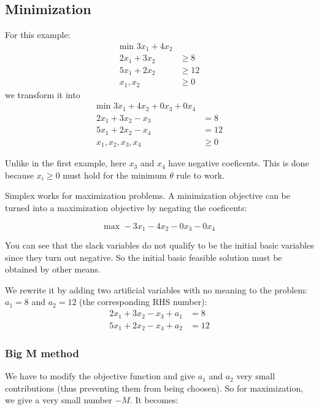 \documentclass[a4paper, 12pt]{article}
\begin{document}
\subsection{Minimization}

For this example:
\begin{align*}
    \text{min } 3x_1 + 4x_2 \\
    2x_1 + 3x_2 &\ge 8 \\
    5x_1 + 2x_2 &\ge 12 \\
    x_1,x_2 &\ge 0
\end{align*}
we transform it into
\begin{align*}
    \text{min } 3x_1 + 4x_2 + 0x_3 + 0x_4 \\
    2x_1 + 3x_2 - x_3 &= 8 \\
    5x_1 + 2x_2 - x_4 &= 12 \\
    x_1,x_2,x_3,x_4 &\ge 0
\end{align*}

Unlike in the first example, here $x_3$ and $x_4$ have negative coeficents. This
is done because $x_i \ge 0$ must hold for the minimum $\theta$ rule to work.

Simplex works for maximization problems. A minimization objective can be turned
into a maximization objective by negating the coeficents:

\begin{equation*}
    \text{max } -3x_1 - 4x_2 - 0x_3 - 0x_4
\end{equation*}

You can see that the slack variables do not qualify to be the initial basic
variables since they turn out negative. So the initial basic feasible solution
must be obtained by other means.

We rewrite it by adding two artificial variables with no meaning to the
problem: $a_1 = 8$ and $a_2 = 12$ (the corresponding RHS number):
\begin{align*}
    2x_1 + 3x_2 - x_3 + a_1 &= 8 \\
    5x_1 + 2x_2 - x_4 + a_2 &= 12
\end{align*}

\subsubsection{Big M method}

We have to modify the objective function and give $a_1$ and $a_2$ very small
contributions (thus preventing them from being choosen). So for maximization,
we give a very small number $-M$. It becomes:
\end{document}
